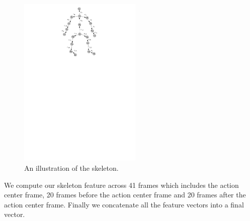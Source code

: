 \documentclass[10pt,twocolumn,letterpaper]{article}
\begin{document}
\begin{figure}[htb]
\begin{center}
\includegraphics[width=2.3in]{skeleton.pdf}
\caption{An illustration of the skeleton. \label{fig:skeleton}}
\end{center}
\end{figure}

We compute our skeleton feature across 41 frames which includes the action center frame, 20 frames before the action center frame and 20 frames after the action center frame. Finally we concatenate all the feature vectors into a final vector.
\end{document}
